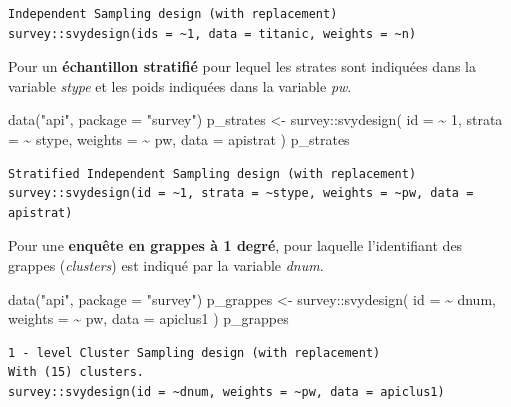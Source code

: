 \documentclass[
  letterpaper,
  DIV=11,
  numbers=noendperiod,
  oneside]{scrreprt}
\newenvironment{Shaded}{\begin{snugshade}}{\end{snugshade}}
\newcommand{\AttributeTok}[1]{\textcolor[rgb]{0.40,0.45,0.13}{#1}}
\newcommand{\DecValTok}[1]{\textcolor[rgb]{0.68,0.00,0.00}{#1}}
\newcommand{\FunctionTok}[1]{\textcolor[rgb]{0.28,0.35,0.67}{#1}}
\newcommand{\NormalTok}[1]{\textcolor[rgb]{0.00,0.23,0.31}{#1}}
\newcommand{\OtherTok}[1]{\textcolor[rgb]{0.00,0.23,0.31}{#1}}
\newcommand{\SpecialCharTok}[1]{\textcolor[rgb]{0.37,0.37,0.37}{#1}}
\newcommand{\StringTok}[1]{\textcolor[rgb]{0.13,0.47,0.30}{#1}}
\begin{document}
\begin{verbatim}
Independent Sampling design (with replacement)
survey::svydesign(ids = ~1, data = titanic, weights = ~n)
\end{verbatim}

Pour un \textbf{échantillon stratifié} pour lequel les strates sont
indiquées dans la variable \emph{stype} et les poids indiquées dans la
variable \emph{pw}.

\begin{Shaded}
\begin{Highlighting}[]
\FunctionTok{data}\NormalTok{(}\StringTok{"api"}\NormalTok{, }\AttributeTok{package =} \StringTok{"survey"}\NormalTok{)}
\NormalTok{p\_strates }\OtherTok{\textless{}{-}}\NormalTok{ survey}\SpecialCharTok{::}\FunctionTok{svydesign}\NormalTok{(}
  \AttributeTok{id =} \SpecialCharTok{\textasciitilde{}} \DecValTok{1}\NormalTok{, }
  \AttributeTok{strata =} \SpecialCharTok{\textasciitilde{}}\NormalTok{ stype, }
  \AttributeTok{weights =} \SpecialCharTok{\textasciitilde{}}\NormalTok{ pw, }
  \AttributeTok{data =}\NormalTok{ apistrat}
\NormalTok{)}
\NormalTok{p\_strates}
\end{Highlighting}
\end{Shaded}

\begin{verbatim}
Stratified Independent Sampling design (with replacement)
survey::svydesign(id = ~1, strata = ~stype, weights = ~pw, data = apistrat)
\end{verbatim}

Pour une \textbf{enquête en grappes à 1 degré}, pour laquelle
l'identifiant des grappes (\emph{clusters}) est indiqué par la variable
\emph{dnum}.

\begin{Shaded}
\begin{Highlighting}[]
\FunctionTok{data}\NormalTok{(}\StringTok{"api"}\NormalTok{, }\AttributeTok{package =} \StringTok{"survey"}\NormalTok{)}
\NormalTok{p\_grappes }\OtherTok{\textless{}{-}}\NormalTok{ survey}\SpecialCharTok{::}\FunctionTok{svydesign}\NormalTok{(}
  \AttributeTok{id =} \SpecialCharTok{\textasciitilde{}}\NormalTok{ dnum, }
  \AttributeTok{weights =} \SpecialCharTok{\textasciitilde{}}\NormalTok{ pw, }
  \AttributeTok{data =}\NormalTok{ apiclus1}
\NormalTok{)}
\NormalTok{p\_grappes}
\end{Highlighting}
\end{Shaded}

\begin{verbatim}
1 - level Cluster Sampling design (with replacement)
With (15) clusters.
survey::svydesign(id = ~dnum, weights = ~pw, data = apiclus1)
\end{verbatim}
\end{document}
